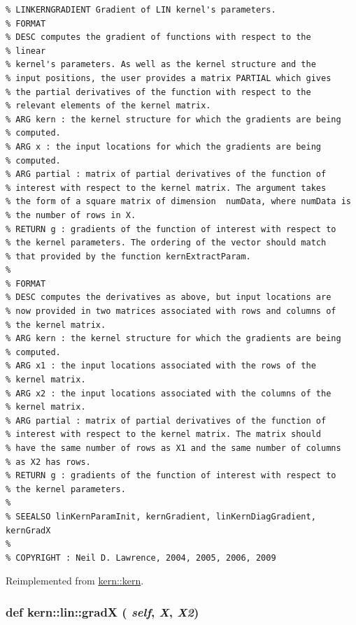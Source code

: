 \footnotesize\begin{verbatim}% LINKERNGRADIENT Gradient of LIN kernel's parameters.
% FORMAT
% DESC computes the gradient of functions with respect to the
% linear
% kernel's parameters. As well as the kernel structure and the
% input positions, the user provides a matrix PARTIAL which gives
% the partial derivatives of the function with respect to the
% relevant elements of the kernel matrix. 
% ARG kern : the kernel structure for which the gradients are being
% computed.
% ARG x : the input locations for which the gradients are being
% computed. 
% ARG partial : matrix of partial derivatives of the function of
% interest with respect to the kernel matrix. The argument takes
% the form of a square matrix of dimension  numData, where numData is
% the number of rows in X.
% RETURN g : gradients of the function of interest with respect to
% the kernel parameters. The ordering of the vector should match
% that provided by the function kernExtractParam.
%
% FORMAT
% DESC computes the derivatives as above, but input locations are
% now provided in two matrices associated with rows and columns of
% the kernel matrix. 
% ARG kern : the kernel structure for which the gradients are being
% computed.
% ARG x1 : the input locations associated with the rows of the
% kernel matrix.
% ARG x2 : the input locations associated with the columns of the
% kernel matrix.
% ARG partial : matrix of partial derivatives of the function of
% interest with respect to the kernel matrix. The matrix should
% have the same number of rows as X1 and the same number of columns
% as X2 has rows.
% RETURN g : gradients of the function of interest with respect to
% the kernel parameters.
%
% SEEALSO linKernParamInit, kernGradient, linKernDiagGradient, kernGradX
%
% COPYRIGHT : Neil D. Lawrence, 2004, 2005, 2006, 2009

\end{verbatim}
\normalsize
 

Reimplemented from \hyperlink{classkern_1_1kern}{kern::kern}.\hypertarget{classkern_1_1lin_ab69ae24e2845a8423f4fb12bae84198}{
\subsubsection[{gradX}]{\setlength{\rightskip}{0pt plus 5cm}def kern::lin::gradX ( {\em self}, \/   {\em X}, \/   {\em X2})}}
\label{classkern_1_1lin_ab69ae24e2845a8423f4fb12bae84198}




